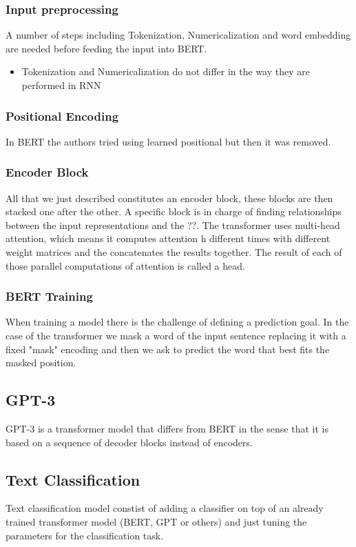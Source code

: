 \documentclass{article}
\begin{document}
\subsubsection*{Input preprocessing}
A number of steps including Tokenization, Numericalization and word embedding are needed before feeding the input into BERT.
\begin{itemize}
    \item Tokenization and Numericalization do not differ in the way they are performed in RNN
\end{itemize}
\subsubsection*{Positional Encoding}
In BERT the authors tried using learned positional but then it was removed.
\subsubsection*{Encoder Block}
All that we just described constitutes an encoder block, these blocks are then stacked one after the other. A specific block is in charge of finding relationships between the input representations and the ??. The transformer uses multi-head attention, which means it computes attention h different times with different weight matrices and the concatenates the results together. The result of each of those parallel computations of attention is called a head.
\subsubsection*{BERT Training}
When training a model there is the challenge of defining a prediction goal. In the case of the transformer we mask a word of the input sentence replacing it with a fixed "mask" encoding and then we ask to predict the word that best fits the masked position. 

\subsection*{GPT-3}
GPT-3 is a transformer model that differs from BERT in the sense that it is based on a sequence of decoder blocks instead of encoders.

\subsection*{Text Classification}
Text classification model constist of adding a classifier on top of an already trained transformer model (BERT, GPT or others) and just tuning the parameters for the classification task.
\end{document}
